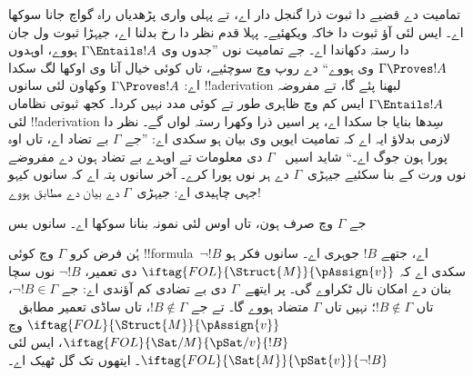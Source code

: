 \documentclass[../../../include/open-logic-section]{subfiles}
\begin{document}
      {}
      {}


تمامیت دے قضیے دا ثبوت ذرا گنجل دار اے، تے پہلی واری پڑھدیاں
راہ گواچ جانا سوکھا اے۔ ایس لئی آؤ ثبوت دا خاکہ ویکھئیے۔ پہلا
قدم نظر دا رخ بدلنا اے، جیہڑا ثبوت ول جان دا رستہ دکھاندا اے۔
جے تمامیت نوں ”جدوں وی $\Gamma
\Entails !A$ ہووے، اوہدوں $\Gamma \Proves !A$ وی ہووے“ دے روپ
وچ سوچئیے، تاں کوئی خیال آنا وی اوکھا لگ سکدا اے: $\Gamma
\Proves !A$ وکھاون لئی سانوں !!a{derivation} لبھنا پئے گا،
تے مفروضہ $\Gamma \Entails !A$ ایس کم وچ ظاہری طور تے
کوئی مدد نہیں کردا۔ کجھ ثبوتی نظاماں لئی !!a{derivation} سِدھا
بنایا جا سکدا اے، پر اسیں ذرا وکھرا رستہ لواں گے۔ نظر دا
لازمی بدلاؤ ایہ اے کہ تمامیت ایویں وی بیان ہو سکدی اے: ”جے
$\Gamma$ بے تضاد اے، تاں اوہ پورا ہون جوگ اے۔“ شاید اسیں
~$\Gamma$ دی معلومات تے اوہدے بے تضاد ہون دے مفروضے نوں
ورت کے  بنا
سکئیے جیہڑی~$\Gamma$ دے ہر
 نوں پورا کرے۔ آخر
سانوں پتہ اے کہ سانوں کیہو جہی
 چاہیدی اے:
جیہڑی~$\Gamma$ دے بیان دے مطابق ہووے!{}

جے $\Gamma$ وچ صرف  ہون، تاں
اوس لئی نمونہ بنانا سوکھا اے۔ سانوں بس

ہُن فرض کرو $\Gamma$ وچ کوئی !!{formula}~$\lnot !B$ اے، جتھے
$!B$ جوہری اے۔ سانوں فکر ہو سکدی اے کہ
$\iftag{FOL}{\Struct{M}}{\pAssign{v}}$ دی تعمیر، $\lnot !B$
نوں سچا بنان دے امکان نال ٹکراوے گی۔ پر ایتھے~$\Gamma$ دی
بے تضادی کم آؤندی اے: جے $\lnot !B \in \Gamma$، تاں
$!B \notin \Gamma$؛ نہیں تاں $\Gamma$ متضاد ہووے گا۔
تے جے $!B \notin \Gamma$، تاں ساڈی تعمیر مطابق
~$\iftag{FOL}{\Struct{M}}{\pAssign{v}}$ وچ
$\iftag{FOL}{\Sat/{M}}{\pSat/{v}}{!B}$، ایس لئی
$\iftag{FOL}{\Sat{M}}{\pSat{v}}{\lnot !B}$۔
ایتھوں تک گل ٹھیک اے۔
\end{document}
